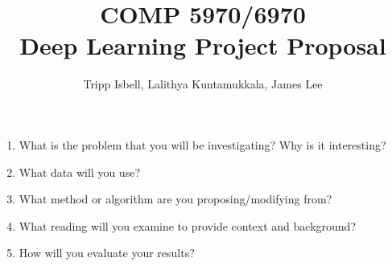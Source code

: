 \documentclass[notitlepage, 11pt]{report}
\title{COMP 5970/6970\\
Deep Learning Project Proposal}
\author{Tripp Isbell, Lalithya Kuntamukkala, James Lee}
\date{}
\begin{document}
\maketitle

\begin{enumerate}
\item What is the problem that you will be investigating? Why is it interesting?
\item What data will you use?
\item What method or algorithm are you proposing/modifying from?
\item What reading will you examine to provide context and background?

\item How will you evaluate your results?

\end{enumerate}
\end{document}
